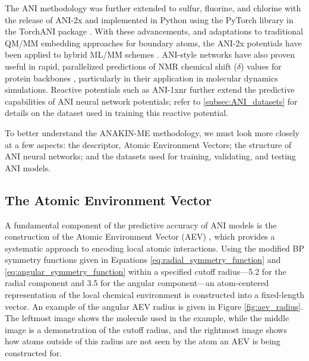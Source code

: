 The ANI methodology was further extended to sulfur, fluorine, and chlorine with the release of ANI-2x \cite{ani-2x, 2x_dataset} and implemented in Python using the PyTorch library \cite{pytorch} in the TorchANI package \cite{torchani}.
With these advancements, and adaptations to traditional QM/MM embedding approaches for boundary atoms, the ANI-2x potentials have been applied to hybrid ML/MM schemes \cite{ml_mm_galvelis, ml_mm_santi_y_jonny1, ml_mm_santi_y_jonny2}.
ANI-style networks have also proven useful in rapid, parallelized predictions of NMR chemical shift ($\delta$) values for protein backbones \cite{legolas, torchani}, particularly in their application in molecular dynamics simulations.
Reactive potentials such as ANI-1xnr \cite{ani-1xnr} further extend the predictive capabilities of ANI neural network potentials; refer to \ref{subsec:ANI_datasets} for details on the dataset used in training this reactive potential.

To better understand the ANAKIN-ME methodology, we must look more closely at a few aspects: the descriptor, Atomic Environment Vectors; the structure of ANI neural networks; and the datasets used for training, validating, and testing ANI models.

\subsection{The Atomic Environment Vector}
\label{subsec:AEV}

A fundamental component of the predictive accuracy of ANI models is the construction of the Atomic Environment Vector (AEV) \cite{ani-1}, which provides a systematic approach to encoding local atomic interactions.
Using the modified BP symmetry functions \cite{behler_parrinello} given in Equations \ref{eq:radial_symmetry_function} and \ref{eq:angular_symmetry_function} within a specified cutoff radius---5.2 \angstrom for the radial component and 3.5 \angstrom for the angular component---an atom-centered representation of the local chemical environment is constructed into a fixed-length vector.
An example of the angular AEV radius is given in Figure \ref{fig:aev_radius}.
The leftmost image shows the molecule used in the example, while the middle image is a demonstration of the cutoff radius, and the rightmost image shows how atoms outside of this radius are not seen by the atom an AEV is being constructed for.

